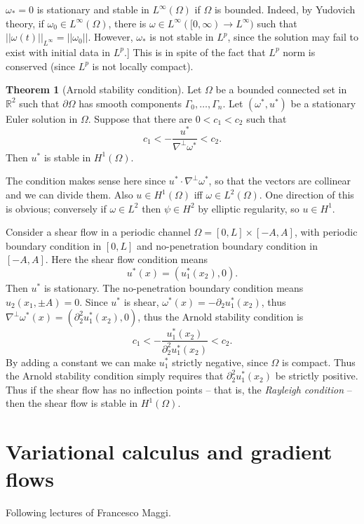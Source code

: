 \documentclass[12pt]{book}
\newcommand{\RR}{\mathbb{R}}
\newcommand{\dfn}[1]{\emph{#1}\index{#1}}
\theoremstyle{definition}
\newtheorem{theorem}{Theorem}[chapter]
\newenvironment{example}
  {\pushQED{\qed}\renewcommand{\qedsymbol}{$\diamondsuit$}\examplex}
  {\popQED\endexamplex}
\begin{document}
\begin{example}
$\omega_* = 0$ is stationary and stable in $L^\infty(\Omega)$ if $\Omega$ is bounded.
Indeed, by Yudovich theory, if $\omega_0 \in L^\infty(\Omega)$, there is $\omega \in L^\infty([0, \infty) \to L^\infty)$ such that $||\omega(t)||_{L^\infty} = ||\omega_0||$.
However, $\omega_*$ is not stable in $L^p$, since the solution may fail to exist with initial data in $L^p$.]
This is in spite of the fact that $L^p$ norm is conserved (since $L^p$ is not locally compact).
\end{example}

\begin{theorem}[Arnold stability condition]
Let $\Omega$ be a bounded connected set in $\RR^2$ such that $\partial \Omega$ has smooth components $\Gamma_0, \dots, \Gamma_n$.
Let $(\omega^*, u^*)$ be a stationary Euler solution in $\Omega$.
Suppose that there are $0 < c_1 < c_2$ such that
$$c_1 < -\frac{u^*}{\nabla^\perp \omega^*} < c_2.$$
Then $u^*$ is stable in $H^1(\Omega)$.
\end{theorem}

The condition makes sense here since $u^* \cdot \nabla^\perp \omega^*$, so that the vectors are collinear and we can divide them.
Also $u \in H^1(\Omega)$ iff $\omega \in L^2(\Omega)$.
One direction of this is obvious; conversely if $\omega \in L^2$ then $\psi \in H^2$ by elliptic regularity, so $u \in H^1$.

\begin{example}
Consider a shear flow in a periodic channel $\Omega = [0, L] \times [-A, A]$, with periodic boundary condition in $[0, L]$ and no-penetration boundary condition in $[-A, A]$.
Here the shear flow condition means
$$u^*(x) = (u_1^*(x_2), 0).$$
Then $u^*$ is stationary. The no-penetration boundary condition means $u_2(x_1, \pm A) = 0$.
Since $u^*$ is shear, $\omega^*(x) = -\partial_2 u_1^*(x_2)$, thus $\nabla^\perp \omega^*(x) = (\partial_2^2 u_1^*(x_2), 0)$, thus the Arnold stability condition is
$$c_1 < -\frac{u_1^*(x_2)}{\partial_2^2 u_1^*(x_2)} < c_2.$$
By adding a constant we can make $u_1^*$ strictly negative, since $\Omega$ is compact.
Thus the Arnold stability condition simply requires that $\partial_2^2 u_1^*(x_2)$ be strictly positive.
Thus if the shear flow has no inflection points -- that is, the \dfn{Rayleigh condition} -- then the shear flow is stable in $H^1(\Omega)$.
\end{example}



\chapter{Variational calculus and gradient flows}
Following lectures of Francesco Maggi.
\end{document}
